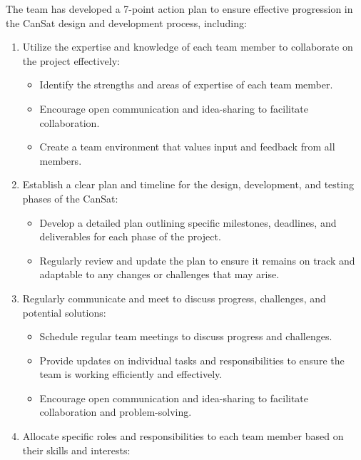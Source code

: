 \documentclass[11pt]{article}
\begin{document}
The team has developed a 7-point action plan to ensure effective progression in the CanSat design and development process, including:
\begin{enumerate}[topsep=3pt]
    \item Utilize the expertise and knowledge of each team member to collaborate on the project effectively:
    \begin{itemize}[leftmargin=0.25cm,itemindent=0.5cm, noitemsep, topsep=2pt, label=]
        \item Identify the strengths and areas of expertise of each team member.
        \item Encourage open communication and idea-sharing to facilitate collaboration.
        \item Create a team environment that values input and feedback from all members.
    \end{itemize}
    \item Establish a clear plan and timeline for the design, development, and testing phases of the CanSat:
    \begin{itemize}[leftmargin=0.25cm,itemindent=0.5cm, noitemsep, topsep=2pt, label=]
        \item Develop a detailed plan outlining specific milestones, deadlines, and deliverables for each phase of the project.
        \item Regularly review and update the plan to ensure it remains on track and adaptable to any changes or challenges that may arise.
    \end{itemize}
    \item Regularly communicate and meet to discuss progress, challenges, and potential solutions:
    \begin{itemize}[leftmargin=0.25cm,itemindent=0.5cm, noitemsep, topsep=2pt, label=]
        \item Schedule regular team meetings to discuss progress and challenges.
        \item Provide updates on individual tasks and responsibilities to ensure the team is working efficiently and effectively.
        \item Encourage open communication and idea-sharing to facilitate collaboration and problem-solving.
    \end{itemize}
    \item Allocate specific roles and responsibilities to each team member based on their skills and interests:
    \begin{itemize}[leftmargin=0.25cm,itemindent=0.5cm, noitemsep, topsep=2pt, label=]

\end{itemize}
\end{enumerate}
\end{document}
